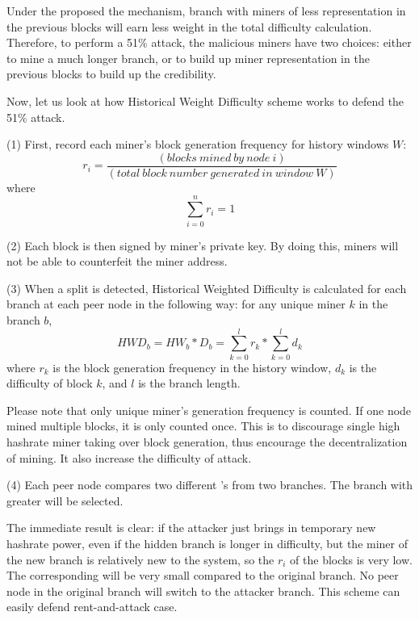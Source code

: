 \documentclass[conference]{IEEEtran}
\begin{document}
Under the proposed the mechanism, branch with miners of less representation in the previous blocks will earn less weight in the total difficulty calculation. Therefore, to perform a 51\% attack, the malicious miners have two choices: either to mine a much longer branch, or to build up miner representation in the previous blocks to build up the credibility.

Now, let us look at how Historical Weight Difficulty scheme works to defend the 51\% attack. 

(1) First, record each miner’s block generation frequency for history windows $W$:
\begin{equation}
r_i=\frac{(blocks\ mined\ by\ node\ i)}{(total\ block\ number\ generated\ in\ window\ W)}\label{eq_frequency_rate}
\end{equation}
where 
\begin{equation}
    \sum_{i=0}^{n}r_i = 1
    \label{eq_frequency_normalization}
\end{equation}

(2) Each block is then signed by miner's private key. By doing this, miners will not be able to counterfeit the miner address.

(3) When a split is detected, Historical Weighted Difficulty  is calculated for each branch at each peer node in the following way: for any unique miner $k$ in the branch $b$,
\begin{equation}
    H\!W\!D_b = H\!W_b * \!D_b = \sum_{k=0}^{l}r_k*\sum_{k=0}^{l}d_k\label{eq_hwd}
\end{equation}
where $r_k$ is the block generation frequency in the history window, $d_k$ is the difficulty of block $k$, and $l$ is the branch length.

Please note that only unique miner's generation frequency is counted. If one node mined multiple blocks, it is only counted once. This is to discourage single high hashrate miner taking over block generation, thus encourage the decentralization of mining. It also increase the difficulty of attack.

(4) Each peer node compares two different 's from two branches. The branch with greater  will be selected.

The immediate result is clear: if the attacker just brings in temporary new hashrate power, even if the hidden branch is longer in difficulty, but the miner of the new branch is relatively new to the system, so the $r_i$ of the blocks is very low. The corresponding  will be very small compared to the original branch. No peer node in the original branch will switch to the attacker branch. This scheme can easily defend rent-and-attack case. 
\end{document}
